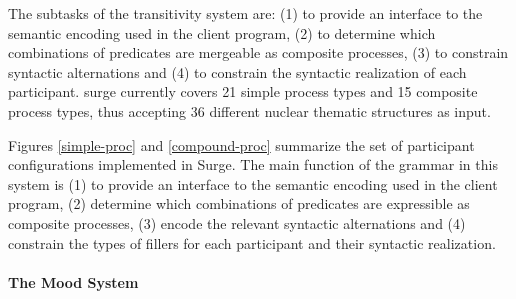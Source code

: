The subtasks of the transitivity system are: (1) to provide an interface to the
semantic encoding used in the client program, (2) to determine which
combinations of predicates are mergeable as composite processes, (3) to
constrain syntactic alternations and (4) to constrain the syntactic realization
of each participant.  {\sc surge} currently covers 21 simple process types and
15 composite process types, thus accepting 36 different nuclear thematic
structures as input.

Figures \ref{simple-proc} and \ref{compound-proc} summarize the set of
participant configurations implemented in Surge.  The main function of the
grammar in this system is (1) to provide an interface to the semantic
encoding used in the client program, (2) determine which combinations of
predicates are expressible as composite processes, (3) encode the relevant
syntactic alternations and (4) constrain the types of fillers for each
participant and their syntactic realization.


\paragraph{The Mood System}

